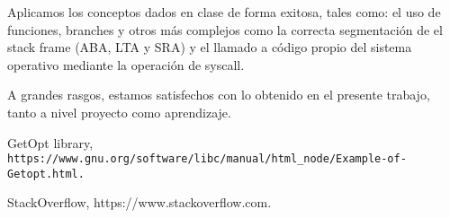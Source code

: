 \documentclass[a4paper]{article}
\begin{document}
Aplicamos los conceptos dados en clase de forma exitosa, tales como: el uso de funciones, branches y otros más complejos como la correcta segmentación de el stack frame (ABA, LTA y SRA) y el llamado a código propio del sistema operativo mediante la operación de syscall. 

A grandes rasgos, estamos satisfechos con lo obtenido en el presente trabajo, tanto a nivel proyecto como aprendizaje.

\begin{thebibliography}{2}

 GetOpt library, 
\texttt{https://www.gnu.org/software/libc/manual/html_node/Example-of-Getopt.html.}

 StackOverflow, https://www.stackoverflow.com.

\end{thebibliography}
\end{document}

